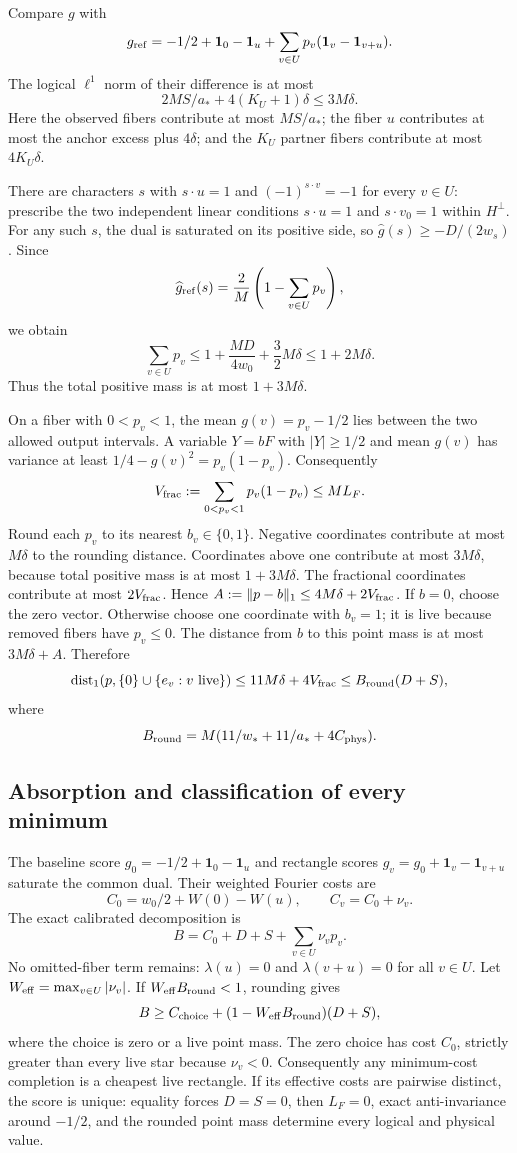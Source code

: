 Compare $g$ with
\[
 g_{\rm ref}=-1/2+\mathbf1_0-\mathbf1_u
              +\sum_{v\in U}p_v(\mathbf1_v-\mathbf1_{v+u}).
\]
The logical $\ell^1$ norm of their difference is at most
\[
 2MS/a_*+4(K_U+1)\delta\le3M\delta.
\]
Here the observed fibers contribute at most $MS/a_*$; the fiber $u$
contributes at most the anchor excess plus $4\delta$; and the $K_U$
partner fibers contribute at most $4K_U\delta$.

There are characters $s$ with $s\cdot u=1$ and
$(-1)^{s\cdot v}=-1$ for every $v\in U$: prescribe the two independent linear conditions
$s\cdot u=1$ and $s\cdot v_0=1$ within $H^\perp$. For any such $s$, the dual is saturated on its
positive side, so $\widehat g(s)\ge-D/(2w_s)$. Since
\[
 \widehat g_{\rm ref}(s)=\frac2M\left(1-\sum_{v\in U}p_v\right),
\]
we obtain
\[
 \sum_{v\in U}p_v\le1+\frac{MD}{4w_0}+\frac32M\delta
 \le1+2M\delta.
\]
Thus the total positive mass is at most $1+3M\delta$.

On a fiber with $0<p_v<1$, the mean $g(v)=p_v-1/2$ lies
between the two allowed output intervals. A variable $Y=bF$ with
$|Y|\ge1/2$ and mean $g(v)$ has variance at least
$1/4-g(v)^2=p_v(1-p_v)$. Consequently
\[
 V_{\rm frac}:=\sum_{0<p_v<1}p_v(1-p_v)\le M L_F.
\]
Round each $p_v$ to its nearest $b_v\in\{0,1\}$. Negative coordinates
contribute at most $M\delta$ to the rounding distance. Coordinates above
one contribute at most $3M\delta$, because total positive mass is at most
$1+3M\delta$. The fractional coordinates contribute at most $2V_{\rm frac}$.
Hence $A:=\|p-b\|_1\le4M\delta+2V_{\rm frac}$.
If $b=0$, choose the zero vector. Otherwise choose one coordinate with
$b_v=1$; it is live because removed fibers have $p_v\le0$. The distance
from $b$ to this point mass is at most $3M\delta+A$. Therefore
\begin{equation}\label{eq:rect-rounding}
 \operatorname{dist}_1(p,\{0\}\cup\{e_v:v\text{ live}\})
 \le11M\delta+4V_{\rm frac}
 \le B_{\rm round}(D+S),
\end{equation}
where
\[
 B_{\rm round}=M(11/w_*+11/a_*+4C_{\rm phys}).
\]

\subsection{Absorption and classification of every minimum}

The baseline score $g_0=-1/2+\mathbf1_0-\mathbf1_u$ and rectangle scores
$g_v=g_0+\mathbf1_v-\mathbf1_{v+u}$ saturate the common dual. Their
weighted Fourier costs are
\[
 C_0=w_0/2+W(0)-W(u),\qquad C_v=C_0+\nu_v.
\]
The exact calibrated decomposition is
\[
 B=C_0+D+S+\sum_{v\in U}\nu_v p_v.
\]
No omitted-fiber term remains: $\lambda(u)=0$ and
$\lambda(v+u)=0$ for all $v\in U$.
Let $W_{\rm eff}=\max_{v\in U}|\nu_v|$. If
$W_{\rm eff}B_{\rm round}<1$, rounding gives
\[
 B\ge C_{\rm choice}+(1-W_{\rm eff}B_{\rm round})(D+S),
\]
where the choice is zero or a live point mass. The zero choice has cost
$C_0$, strictly greater than every live star because $\nu_v<0$.
Consequently any minimum-cost completion is a cheapest live rectangle.
If its effective costs are pairwise distinct, the score is unique:
equality forces $D=S=0$, then $L_F=0$, exact anti-invariance around
$-1/2$, and the rounded point mass determine every logical and physical
value.

